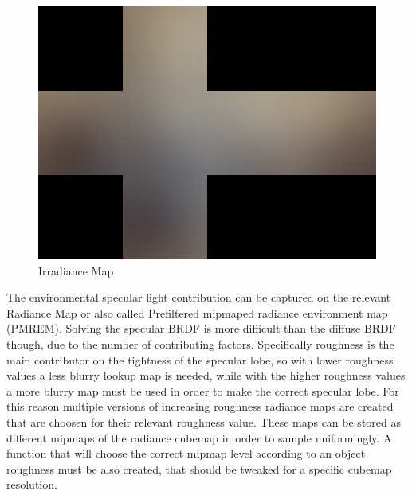 \begin{figure}[ht]
    \centering
    \includegraphics[scale=0.18,clip=true]{./image/envl_irr.png}
    \caption{Irradiance Map}
\label{fig:envlirr}
\end{figure}

The environmental specular light contribution can be captured on the relevant Radiance Map or also called Prefiltered mipmaped
radiance environment map (PMREM). Solving the specular BRDF is more difficult than the diffuse BRDF though, due to the number of
contributing factors. Specifically roughness is the main contributor on the tightness of the specular lobe, so with lower roughness
values a less blurry lookup map is needed, while with the higher roughness values a more blurry map must be used in order to make
the correct specular lobe. For this reason multiple versions of increasing roughness radiance maps are created that are choosen
for their relevant roughness value. These maps can be stored as different mipmaps of the radiance cubemap in order to sample uniformingly.
A function that will choose the correct mipmap level according to an object roughness must be also created, that should be tweaked
for a specific cubemap resolution.

